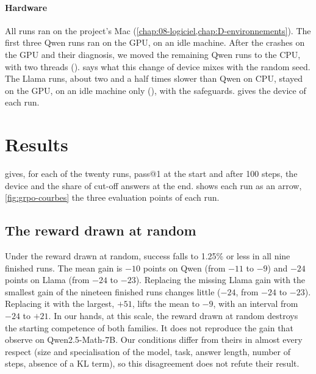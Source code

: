 \paragraph{Hardware} All runs ran on the project's Mac
(\cref{chap:08-logiciel,chap:D-environnements}). The first three Qwen runs ran on the GPU, on an
idle machine. After the crashes on the GPU and their diagnosis,
we moved the remaining Qwen runs to the CPU, with two threads ().  says
what this change of device mixes with the random seed. The Llama
runs, about two and a half times slower than Qwen on CPU, stayed on the GPU, on an idle machine only
(), with the safeguards.  gives the device of each run.

\section{Results}
\label{sec:llm-resultats}


 gives, for each of the twenty runs, pass@1 at the start and after 100 steps, the
device and the share of cut-off answers at the end.  shows each run as an
arrow, \cref{fig:grpo-courbes} the three evaluation points of each run.



\subsection{The reward drawn at random}

Under the reward drawn at random, success falls to 1.25\% or less in all nine finished runs. The mean gain is $-10$
points on Qwen (from $-11$ to $-9$) and $-24$ points on Llama (from $-24$ to $-23$). Replacing the
missing Llama gain with the smallest gain of the nineteen finished runs changes little ($-24$, from
$-24$ to $-23$). Replacing it with the largest, $+51$, lifts the mean to $-9$, with an interval from
$-24$ to $+21$. In our hands, at this scale, the reward drawn at random destroys the starting
competence of both families. It does not reproduce the gain that \textcite{shao2025spurious} observe
on Qwen2.5-Math-7B. Our conditions differ from theirs in almost every respect (size and
specialisation of the model, task, answer length, number of steps, absence of a KL term), so this
disagreement does not refute their result.

